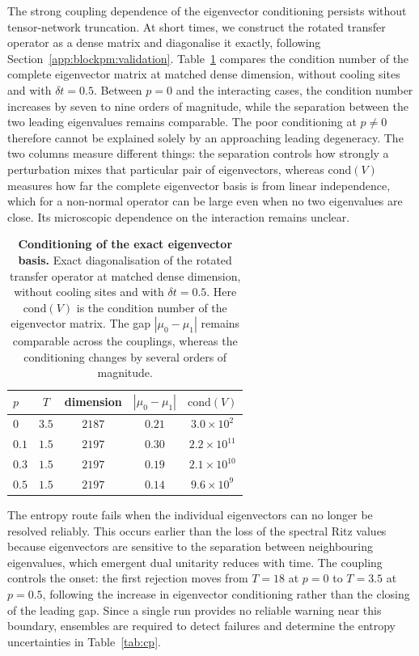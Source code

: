 The strong coupling dependence of the eigenvector conditioning persists without tensor-network truncation. At short times, we construct the rotated transfer operator as a dense matrix and diagonalise it exactly, following Section~\ref{app:blockpm:validation}. Table~\ref{tab:dense_cond} compares the condition number of the complete eigenvector matrix at matched dense dimension, without cooling sites and with $\delta t=0.5$. Between $p=0$ and the interacting cases, the condition number increases by seven to nine orders of magnitude, while the separation between the two leading eigenvalues remains comparable. The poor conditioning at $p\neq0$ therefore cannot be explained solely by an approaching leading degeneracy. The two columns measure different things: the separation controls how strongly a perturbation mixes that particular pair of eigenvectors, whereas $\mathrm{cond}(V)$ measures how far the complete eigenvector basis is from linear independence, which for a non-normal operator can be large even when no two eigenvalues are close. Its microscopic dependence on the interaction remains unclear.

\begin{table}[!htb]
  \centering
  \begin{tabular}{lcccc}
    \hline
    $p$   & $T$   & dimension & $|\mu_0-\mu_1|$ & $\mathrm{cond}(V)$ \\
    \hline
    $0$   & $3.5$ & $2187$    & $0.21$          & $3.0\times10^{2}$  \\
    $0.1$ & $1.5$ & $2197$    & $0.30$          & $2.2\times10^{11}$ \\
    $0.3$ & $1.5$ & $2197$    & $0.19$          & $2.1\times10^{10}$ \\
    $0.5$ & $1.5$ & $2197$    & $0.14$          & $9.6\times10^{9}$  \\
    \hline
  \end{tabular}
  \caption{\textbf{Conditioning of the exact eigenvector basis.} Exact diagonalisation of the rotated transfer operator at matched dense dimension, without cooling sites and with $\delta t=0.5$. Here $\mathrm{cond}(V)$ is the condition number of the eigenvector matrix. The gap $|\mu_0-\mu_1|$ remains comparable across the couplings, whereas the conditioning changes by several orders of magnitude.}
  \label{tab:dense_cond}
\end{table}

The entropy route fails when the individual eigenvectors can no longer be resolved reliably. This occurs earlier than the loss of the spectral Ritz values because eigenvectors are sensitive to the separation between neighbouring eigenvalues, which emergent dual unitarity reduces with time. The coupling controls the onset: the first rejection moves from $T=18$ at $p=0$ to $T=3.5$ at $p=0.5$, following the increase in eigenvector conditioning rather than the closing of the leading gap. Since a single run provides no reliable warning near this boundary, ensembles are required to detect failures and determine the entropy uncertainties in Table~\ref{tab:cp}.

